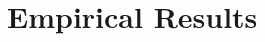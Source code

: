 \documentclass[letterpaper]{article} %
\theoremstyle{definition}
\newcommand{\kibitz}[2]{\ifnum\Comments=1{\color{#1}{#2}}\fi}
\newcommand{\ym}[1]{\kibitz{blue}{[YM:#1]}}
\begin{document}



\section{Empirical Results}
\label{sec:results}
\end{document}
